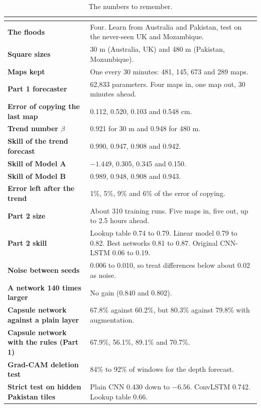 \begin{table}[!htbp]
\centering\small
\caption{The numbers to remember.}
\begin{tabularx}{\linewidth}{|>{\bfseries}p{4.3cm}|Y|}
\hline
{}  & \\ \hline
The floods & Four. Learn from Australia and Pakistan, test on the never-seen UK and Mozambique.\\ \hline
Square sizes & 30 m (Australia, UK) and 480 m (Pakistan, Mozambique).\\ \hline
Maps kept & One every 30 minutes: 481, 145, 673 and 289 maps.\\ \hline
Part 1 forecaster & 62,833 parameters. Four maps in, one map out, 30 minutes ahead.\\ \hline
Error of copying the last map & 0.112, 0.520, 0.103 and 0.548 cm.\\ \hline
Trend number $\beta$ & 0.921 for 30 m and 0.948 for 480 m.\\ \hline
Skill of the trend forecast & 0.990, 0.947, 0.908 and 0.942.\\ \hline
Skill of Model A & $-1.449$, 0.305, 0.345 and 0.150.\\ \hline
Skill of Model B & 0.989, 0.948, 0.908 and 0.943.\\ \hline
Error left after the trend & 1\%, 5\%, 9\% and 6\% of the error of copying.\\ \hline
Part 2 size & About 310 training runs. Five maps in, five out, up to 2.5 hours ahead.\\ \hline
Part 2 skill & Lookup table 0.74 to 0.79. Linear model 0.79 to 0.82. Best networks 0.81 to 0.87. Original CNN-LSTM 0.06 to 0.19.\\ \hline
Noise between seeds & 0.006 to 0.010, so treat differences below about 0.02 as noise.\\ \hline
A network 140 times larger & No gain (0.840 and 0.802).\\ \hline
Capsule network against a plain layer & 67.8\% against 60.2\%, but 80.3\% against 79.8\% with augmentation.\\ \hline
Capsule network with the rules (Part 1) & 67.9\%, 56.1\%, 89.1\% and 70.7\%.\\ \hline
Grad-CAM deletion test & 84\% to 92\% of windows for the depth forecast.\\ \hline
Strict test on hidden Pakistan tiles & Plain CNN 0.430 down to $-6.56$. ConvLSTM 0.742. Lookup table 0.66.\\ \hline
\end{tabularx}
\end{table}
